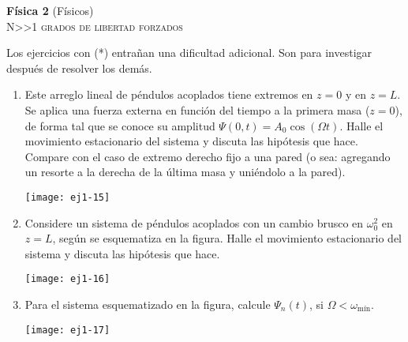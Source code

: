 \documentclass[11pt,spanish,a4paper]{article}
\begin{document}
\begin{center}
	\textbf{Física 2} (Físicos) \hfill {}\\
	\textsc{\LARGE N\textgreater\textgreater1 grados de libertad forzados}
\end{center}

Los ejercicios con (*) entrañan una dificultad adicional. Son para investigar después de resolver los demás.


\begin{enumerate}

				
\item
\begin{minipage}[t][3.5cm]{0.6\textwidth}
Este arreglo lineal de péndulos acoplados tiene extremos en $z= 0$ y en $z= L$.
Se aplica una fuerza externa en función del tiempo a la primera masa ($z=0$), de forma tal que se conoce su amplitud $\Psi(0,t)= A_0 \cos(\Omega t)$.
Halle el movimiento estacionario del sistema y discuta las hipótesis que hace.
Compare con el caso de extremo derecho fijo a una pared (o sea: agregando un resorte a la derecha de la última masa y uniéndolo a la pared). 
\end{minipage}
\begin{minipage}[c][0cm][t]{0.35\textwidth}
  \texttt{[image: ej1-15]}
\end{minipage}



\item
\begin{minipage}[t][4cm]{0.35\textwidth}
Considere un sistema de péndulos acoplados con un cambio brusco en $\omega_{0}^{2}$ en $z=L$, según se esquematiza en la figura.
Halle el movimiento estacionario del sistema y discuta las hipótesis que hace.
\end{minipage}
\begin{minipage}[c][1cm][t]{0.6\textwidth}
  \texttt{[image: ej1-16]}
\end{minipage}



\item
\begin{minipage}[t][3.5cm]{0.45\textwidth}
Para el sistema esquematizado en la figura, calcule $\Psi_{n}(t)$, si $\Omega<\omega_\textrm{mín}$.
\end{minipage}
\begin{minipage}[c][2cm][t]{0.5\textwidth}
  \texttt{[image: ej1-17]}
\end{minipage}




\end{enumerate}
\end{document}
